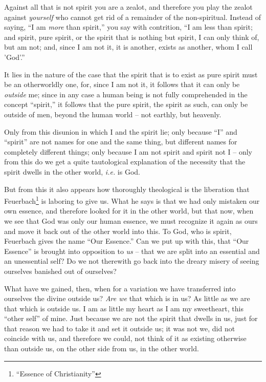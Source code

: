 \documentclass[12pt,a4paper]{book}
\begin{document}
Against all that is not spirit you are a zealot, and therefore you play the 
zealot against \textit{yourself} who cannot get rid of a remainder of the 
non-spiritual. Instead of saying, ``I am \textit{more} than spirit,'' you 
say with contrition, ``I am less than spirit; and spirit, pure spirit, or the 
spirit that is nothing but spirit, I can only think of, but am not; and, since 
I am not it, it is another, exists as another, whom I call 'God'.''

It lies in the nature of the case that the spirit that is to exist as pure 
spirit must be an otherworldly one, for, since I am not it, it follows that it 
can only be \textit{outside} me; since in any case a human being is not fully 
comprehended in the concept ``spirit,'' it follows that the pure spirit, the 
spirit as such, can only be outside of men, beyond the human world -- not 
earthly, but heavenly.

Only from this disunion in which I and the spirit lie; only because ``I'' 
and ``spirit'' are not names for one and the same thing, but different names 
for completely different things; only because I am not spirit and spirit not I 
-- only from this do we get a quite tautological explanation of the necessity 
that the spirit dwells in the other world, \textit{i.e.} is God.

But from this it also appears how thoroughly theological is the liberation 
that Feuerbach\footnote{``Essence of Christianity''} is laboring to give us. 
What he says is that we had only mistaken our own essence, and therefore 
looked for it in the other world, but that now, when we see that God was only 
our human essence, we must recognize it again as ours and move it back out of 
the other world into this. To God, who is spirit, Feuerbach gives the name 
``Our Essence.'' Can we put up with this, that ``Our Essence'' is brought 
into opposition to \textit{us} -- that we are split into an essential and an 
unessential self? Do we not therewith go back into the dreary misery of seeing 
ourselves banished out of ourselves?

What have we gained, then, when for a variation we have transferred into 
ourselves the divine outside us? \textit{Are we} that which is in us? As 
little as we are that which is outside us. I am as little my heart as I am my 
sweetheart, this ``other self'' of mine. Just because we are not the spirit 
that dwells in us, just for that reason we had to take it and set it outside 
us; it was not we, did not coincide with us, and therefore we could, not think 
of it as existing otherwise than outside us, on the other side from us, in the 
other world.
\end{document}
